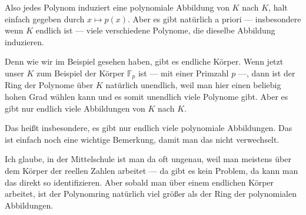 \begin{math-stroke}

\end{math-stroke}

\begin{spoken-clean}[00:06:20 - 00:08:05]
Also jedes Polynom induziert eine polynomiale Abbildung von $K$ nach $K$, halt einfach gegeben durch $x \mapsto p(x)$. Aber es gibt natürlich a priori --- insbesondere wenn $K$ endlich ist --- viele verschiedene Polynome, die dieselbe Abbildung induzieren. 

Denn wie wir im Beispiel gesehen haben, gibt es endliche Körper. Wenn jetzt unser $K$ zum Beispiel der Körper $\mathbb{F}_p$ ist --- mit einer Primzahl $p$ ---, dann ist der Ring der Polynome über $K$ natürlich unendlich, weil man hier einen beliebig hohen Grad wählen kann und es somit unendlich viele Polynome gibt. Aber es gibt nur endlich viele Abbildungen von $K$ nach $K$.
\end{spoken-clean}

\begin{spoken-clean}[00:08:05 - 00:10:45]
Das heißt insbesondere, es gibt nur endlich viele polynomiale Abbildungen. Das ist einfach noch eine wichtige Bemerkung, damit man das nicht verwechselt. 

Ich glaube, in der Mittelschule ist man da oft ungenau, weil man meistens über dem Körper der reellen Zahlen arbeitet --- da gibt es kein Problem, da kann man das direkt so identifizieren. Aber sobald man über einem endlichen Körper arbeitet, ist der Polynomring natürlich viel größer als der Ring der polynomialen Abbildungen.
\end{spoken-clean}

